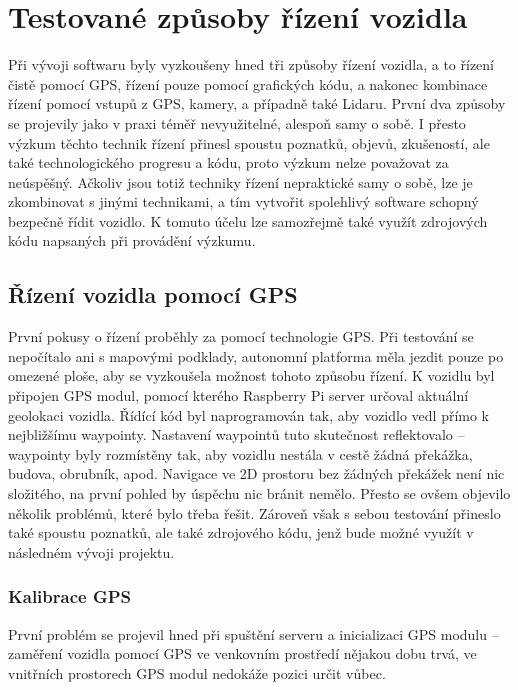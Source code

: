 \documentclass[czech, bachelor]{diploma}
\begin{document}
\chapter{Testované způsoby řízení vozidla} \label{driving-methods}

Při vývoji softwaru byly vyzkoušeny hned tři způsoby řízení vozidla, a to řízení čistě pomocí GPS, řízení pouze pomocí grafických
kódu, a nakonec kombinace řízení pomocí vstupů z GPS, kamery, a případně také Lidaru. První dva způsoby se projevily jako v praxi
téměř nevyužitelné, alespoň samy o sobě. I přesto výzkum těchto technik řízení přinesl spoustu poznatků, objevů, zkušeností, ale
také technologického progresu a kódu, proto výzkum nelze považovat za neúspěšný. Ačkoliv jsou totiž techniky řízení nepraktické
samy o sobě, lze je zkombinovat s jinými technikami, a tím vytvořit spolehlivý software schopný bezpečně řídit vozidlo. K tomuto
účelu lze samozřejmě také využít zdrojových kódu napsaných při provádění výzkumu.

\section{Řízení vozidla pomocí GPS} \label{gps-failure}

První pokusy o řízení proběhly za pomocí technologie GPS. Při testování se nepočítalo ani s mapovými podklady, autonomní platforma
měla jezdit pouze po omezené ploše, aby se vyzkoušela možnost tohoto způsobu řízení. K vozidlu byl připojen GPS modul, pomocí
kterého Raspberry Pi server určoval aktuální geolokaci vozidla. Řídící kód byl naprogramován tak, aby vozidlo vedl přímo
k nejbližšímu waypointy. Nastavení waypointů tuto skutečnost reflektovalo -- waypointy byly rozmístěny tak, aby vozidlu nestála
v cestě žádná překážka, budova, obrubník, apod. Navigace ve 2D prostoru bez žádných překážek není nic složitého, na první pohled
by úspěchu nic bránit nemělo. Přesto se ovšem objevilo několik problémů, které bylo třeba řešit. Zároveň však s sebou testování
přineslo také spoustu poznatků, ale také zdrojového kódu, jenž bude možné využít v následném vývoji projektu.

\subsection{Kalibrace GPS}

První problém se projevil hned při spuštění serveru a inicializaci GPS modulu -- zaměření vozidla pomocí GPS ve venkovním
prostředí nějakou dobu trvá, ve vnitřních prostorech GPS modul nedokáže pozici určit vůbec.
\end{document}

